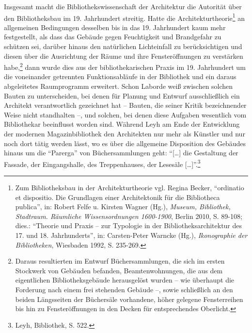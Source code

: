 Insgesamt macht die Bibliothekswissenschaft der Architektur die
Autorität über den Bibliotheksbau im 19. Jahrhundert streitig. Hatte die
Architekturtheorie\footnote{Zum Bibliotheksbau in der Architekturtheorie
  vgl. Regina Becker, \enquote{ordinatio et dispositio. Die Grundlagen
  einer Architektonik für die Bibliotheca publica}, in: Robert Felfe u.
  Kirsten Wagner (Hg.), \emph{Museum, Bibliothek, Stadtraum. Räumliche
  Wissensordnungen 1600-1900}, Berlin 2010, S. 89-108; dies.:
  \enquote{Theorie und Praxis -- zur Typologie in der
  Bibliotheksarchitektur des 17. und 18. Jahrhunderts}, in:
  Carsten-Peter Warncke (Hg.), \emph{Ikonographie der Bibliotheken},
  Wiesbaden 1992, S. 235-269.} an allgemeinen Bedingungen desselben bis
in das 19. Jahrhundert kaum mehr festgestellt, als dass das Gebäude
gegen Feuchtigkeit und Brandgefahr zu schützen sei, darüber hinaus den
natürlichen Lichteinfall zu berücksichtigen und diesen über die
Ausrichtung der Räume und ihre Fensteröffnungen zu verstärken
habe,\footnote{Daraus resultierten im Entwurf Büchersammlungen, die sich
  im ersten Stockwerk von Gebäuden befanden, Beamtenwohnungen, die aus
  dem eigentlichen Bibliotheksgebäude herausgelöst wurden -- wie
  überhaupt die Forderung nach einem frei stehenden Gebäude --, sowie
  schließlich an den beiden Längsseiten der Büchersäle vorhandene, höher
  gelegene Fensterreihen bis hin zu Fensteröffnungen in den Decken für
  entsprechendes Oberlicht.} dann wurde dies aus der bibliothekarischen
Praxis im 19. Jahrhundert um die voneinander getrennten Funktionsabläufe
in der Bibliothek und ein daraus abgeleitetes Raumprogramm erweitert.
Schon Laborde weiß zwischen solchen Bauten zu unterscheiden, bei denen
für Planung und Entwurf ausschließlich ein Architekt verantwortlich
gezeichnet hat -- Bauten, die seiner Kritik bezeichnender Weise nicht
standhalten --, und solchen, bei denen diese Aufgaben wesentlich vom
Bibliothekar beeinflusst worden sind. Während Leyh am Ende der
Entwicklung der modernen Magazinbibliothek den Architekten nur mehr als
Künstler und nur noch dort tätig werden lässt, wo es über die allgemeine
Disposition des Gebäudes hinaus um die \enquote{Parerga} von
Büchersammlungen geht: \enquote{{[}\ldots{}{]} die Gestaltung der
Fassade, der Eingangshalle, des Treppenhauses, der Lesesäle
{[}\ldots{}{]}}.\footnote{Leyh, Bibliothek, S. 522.}

